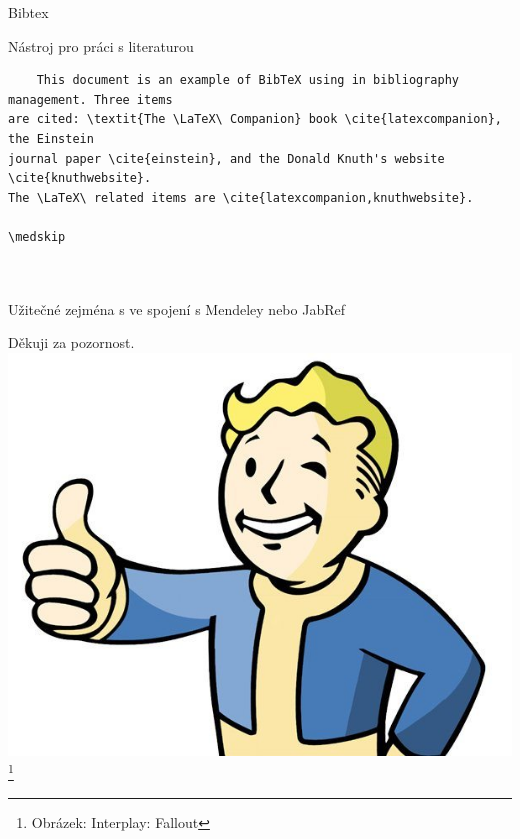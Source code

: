 \documentclass{beamer}
\begin{document}
\begin{frame}{Bibtex}

Nástroj pro práci s literaturou

\begin{verbatim}
    This document is an example of BibTeX using in bibliography management. Three items 
are cited: \textit{The \LaTeX\ Companion} book \cite{latexcompanion}, the Einstein
journal paper \cite{einstein}, and the Donald Knuth's website \cite{knuthwebsite}. 
The \LaTeX\ related items are \cite{latexcompanion,knuthwebsite}. 

\medskip



\end{verbatim}

Užitečné zejména s ve spojení s Mendeley nebo JabRef
    
\end{frame}




\begin{frame}{Děkuji za pozornost.}
\centering
\includegraphics[width=.8\textwidth]{pic/Thumbs-up.jpg}
\footnote{Obrázek: Interplay: Fallout}
\end{frame}
\end{document}
